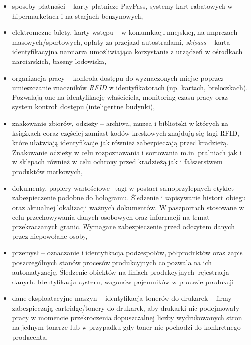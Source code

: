 \begin{itemize}
\begin{itemize}
\begin{itemize}
	\item sposoby płatności – karty płatnicze PayPass, systemy kart rabatowych w hipermarketach i na stacjach benzynowych, 

	\item elektroniczne bilety, karty wstępu – w komunikacji miejskiej, na imprezach masowych/sportowych, opłaty za przejazd autostradami, \emph{skipass} – karta identyfikacyjna narciarza umożliwiająca korzystanie z urządzeń w ośrodkach narciarskich, baseny lodowiska,

	\item organizacja pracy – kontrola dostępu do wyznaczonych miejsc poprzez umieszczanie znaczników \emph{RFID} w identyfikatorach (np. kartach, breloczkach). Pozwalają one na identyfikację właściciela, monitoring czasu pracy oraz system kontroli dostępu (inteligentne budynki),

	\item znakowanie zbiorów, odzieży – archiwa, muzea i biblioteki w których na książkach coraz częściej zamiast kodów kreskowych znajdują się tagi RFID, które ułatwiają identyfikacje jak również zabezpieczają przed kradzieżą. Znakowanie odzieży w celu rozpoznawania i sortowania m.in. pralniach jak i w sklepach również w celu ochrony przed kradzieżą jak i fałszerstwem produktów markowych,
 	
 	\item dokumenty, papiery wartościowe– tagi w postaci samoprzylepnych etykiet – zabezpieczenie podobne do hologramu. Śledzenie i zapisywanie historii obiegu oraz aktualnej lokalizacji ważnych dokumentów.  W paszportach stosowane w celu przechowywania danych osobowych oraz informacji na temat przekraczanych granic. Wymagane zabezpieczenie przed odczytem danych przez niepowołane osoby,
	
	\item przemysł – oznaczanie i  identyfikacja podzespołów, półproduktów oraz zapis poszczególnych stanów procesów produkcyjnych co pozwala na ich automatyzację. Śledzenie obiektów na liniach produkcyjnych, rejestracja danych. Identyfikacja cystern, wagonów pojemników w procesie produkcji
	
	\item dane eksploatacyjne maszyn – identyfikacja tonerów do drukarek – firmy zabezpieczają cartridge/tonery do drukarek, aby drukarki nie podejmowały pracy w momencie przekroczenia dopuszczalnej liczby wydrukowanych stron na jednym tonerze lub w przypadku gdy toner nie pochodzi do konkretnego producenta, 
	

\end{itemize}
\end{itemize}
\end{itemize}
